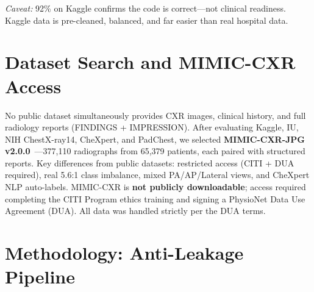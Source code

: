 \documentclass{article}
\begin{document}
\begin{table}[h]
\centering
\caption{Stage 0: Results on public datasets.}
\label{tab:stage0}
\end{table}

\noindent\textit{Caveat:} 92\% on Kaggle confirms the code is correct---not
clinical readiness. Kaggle data is pre-cleaned, balanced, and far easier than
real hospital data.

\section{Dataset Search and MIMIC-CXR Access}

No public dataset simultaneously provides CXR images, clinical history, and
full radiology reports (FINDINGS + IMPRESSION). After evaluating Kaggle, IU,
NIH ChestX-ray14, CheXpert, and PadChest, we selected
\textbf{MIMIC-CXR-JPG v2.0.0}~\cite{johnson2019mimic}---377,110 radiographs
from 65,379 patients, each paired with structured reports. Key differences
from public datasets: restricted access (CITI + DUA required),
real 5.6:1 class imbalance, mixed PA/AP/Lateral views, and CheXpert NLP
auto-labels. MIMIC-CXR is \textbf{not publicly downloadable}; access required
completing the CITI Program ethics training and signing a PhysioNet
Data Use Agreement (DUA). All data was handled strictly per the DUA terms.

\section{Methodology: Anti-Leakage Pipeline}
\end{document}
